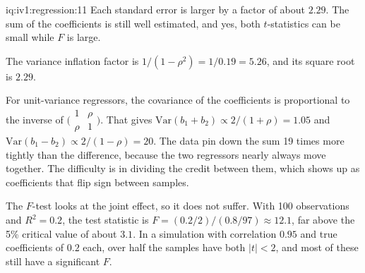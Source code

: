 \begin{solution}{iq:iv1:regression:11}
Each standard error is larger by a factor of about $2.29$. The sum of the coefficients is still well estimated, and yes, both $t$-statistics can be small while $F$ is large.

The variance inflation factor is $1/(1 - \rho^2) = 1/0.19 = 5.26$, and its square root is $2.29$.

For unit-variance regressors, the covariance of the coefficients is proportional to the inverse of $\bigl(\begin{smallmatrix}1 & \rho\\ \rho & 1\end{smallmatrix}\bigr)$. That gives $\mathrm{Var}(b_1 + b_2) \propto 2/(1 + \rho) = 1.05$ and $\mathrm{Var}(b_1 - b_2) \propto 2/(1 - \rho) = 20$. The data pin down the sum 19 times more tightly than the difference, because the two regressors nearly always move together. The difficulty is in dividing the credit between them, which shows up as coefficients that flip sign between samples.

The $F$-test looks at the joint effect, so it does not suffer. With 100 observations and $R^2 = 0.2$, the test statistic is $F = (0.2/2)/(0.8/97) \approx 12.1$, far above the 5\% critical value of about $3.1$. In a simulation with correlation $0.95$ and true coefficients of $0.2$ each, over half the samples have both $|t| < 2$, and most of these still have a significant $F$.

\end{solution}

